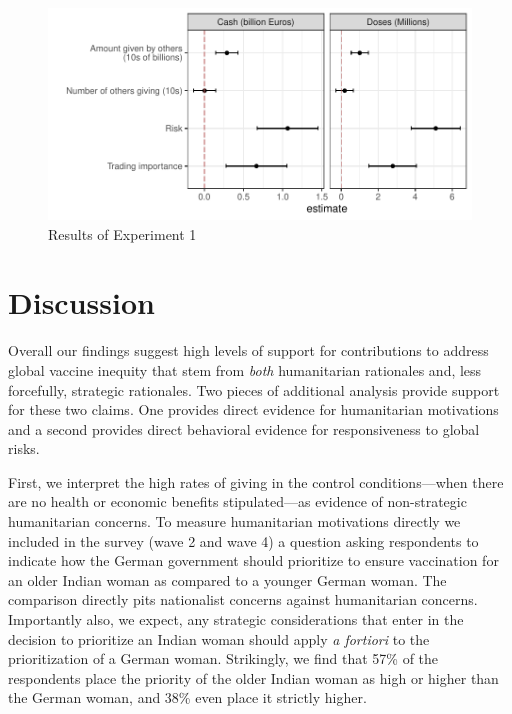 \documentclass[12pt,oneside]{article}
\begin{document}
\begin{figure}[hbt!]
	\includegraphics[width=\linewidth]{"../2_output/E1_main.pdf"}
	\caption{Results of Experiment 1}
	\label{fig:main1}
\end{figure}



\section*{Discussion}

Overall our findings suggest high levels of support for contributions to address global vaccine inequity that stem from \textit{both} humanitarian rationales and, less forcefully, strategic rationales. Two pieces of additional analysis provide support for these two claims. One provides direct evidence for humanitarian motivations and a second provides direct behavioral evidence for responsiveness to global risks.  



First, we interpret the high rates of giving in the control conditions---when there are no health or economic benefits stipulated---as evidence of non-strategic humanitarian concerns. To measure humanitarian motivations directly we included in the survey (wave 2 and wave 4) a question asking respondents to indicate how  the German government should prioritize to ensure vaccination for an older Indian woman as compared to a younger German woman. The comparison directly pits nationalist concerns against humanitarian concerns. Importantly also, we expect, any strategic considerations that enter in the decision to prioritize an Indian woman should apply \textit{a fortiori} to the prioritization of a German woman. Strikingly, we find that 57\% of the respondents place the priority of the older Indian woman as high or higher than the German woman, and 38\% even place it strictly higher. 
\end{document}
